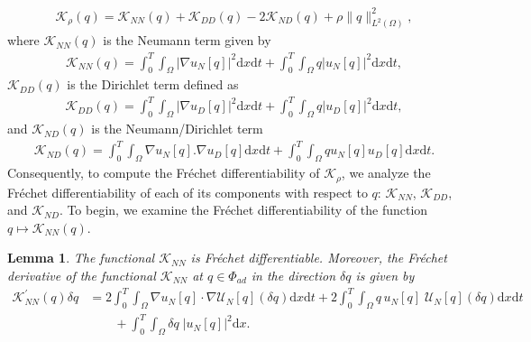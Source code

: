 \documentclass[a4paper,12pt,reqno,natbib]{amsart}
\newtheorem{lemma}[theorem]{Lemma}
\newcommand{\dx} {\displaystyle\mathrm{d}x}
\newcommand{\dt} {\displaystyle\mathrm{d}t}
\def\K{\mathcal K}
\begin{document}
\begin{align*}
    \mathcal{K}_\rho(q)= \mathcal{K}_{NN}(q) + \mathcal{K}_{DD}(q) -2\mathcal{K}_{ND}(q)+\rho\|q\|^2_{L^2(\Omega)},
\end{align*}
where $\mathcal{K}_{NN}(q)$ is the Neumann term given by
\begin{align*}
    \mathcal{K}_{NN}(q)=\int_0^T\int_\Omega\Big|\nabla u_N[q]\Big|^2\dx\dt +\int_0^T\int_{\Omega}q\Big| u_N[q]\Big|^2 \dx \dt,
\end{align*}
$\mathcal{K}_{DD}(q)$ is the Dirichlet term defined as
\begin{align*}
    \mathcal{K}_{DD}(q)=\int_0^T\int_\Omega\Big|\nabla u_D[q]\Big|^2\dx\dt +\int_0^T\int_{\Omega}q\Big| u_D[q]\Big|^2 \dx \dt,
\end{align*}
and $\mathcal{K}_{ND}(q)$ is the Neumann/Dirichlet term
\begin{align*}
        \mathcal{K}_{ND}(q)=\int_0^T\int_{\Omega}\nabla u_N[q] .\nabla u_D[q] \dx \dt
    +\int_0^T\int_{\Omega}q  u_N[q] u_D[q] \dx \dt.
\end{align*}
Consequently, to compute the Fr\'echet differentiability of $\K_\rho$, we analyze the Fr\'echet differentiability of each of its components with respect to $q$: $\mathcal{K}_{NN}$, $\mathcal{K}_{DD}$, and $\mathcal{K}_{ND}$. To begin, we examine the Fr\'echet differentiability of the function $q \mapsto \mathcal{K}_{NN}(q)$. 

\begin{lemma}\label{lemm10}
The functional $\mathcal{K}_{NN}$ is Fr\'echet differentiable. Moreover, the Fr\'echet derivative of the functional $\mathcal{K}_{NN}$ at $q\in\Phi_{ad}$ in the direction $\delta q$ is given by
\begin{align*}
    \mathcal{K}_{NN}^{\prime}(q)\delta q&=2\int_0^T\int_\Omega\nabla u_N[q]\cdot\nabla \mathcal{U}_N[q](\delta q)\dx\dt +2\int_0^T\int_\Omega q\,u_N[q]\; \mathcal{U}_N[q](\delta q)\dx\dt\\
    &\qquad+\int_0^T\int_{\Omega}  \delta q\; |u_N[q]|^2 \dx.
\end{align*}
\end{lemma}
\end{document}
